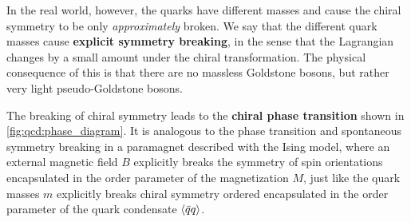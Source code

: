In the real world, however, the quarks have different masses and cause the chiral symmetry to be only \emph{approximately} broken.
We say that the different quark masses cause \textbf{explicit symmetry breaking}, in the sense that the Lagrangian changes by a small amount under the chiral transformation.
The physical consequence of this is that there are no massless Goldstone bosons, but rather very light pseudo-Goldstone bosons.

The breaking of chiral symmetry leads to the \textbf{chiral phase transition} shown in \cref{fig:qcd:phase_diagram}.
It is analogous to the phase transition and spontaneous symmetry breaking in a paramagnet described with the Ising model,
where an external magnetic field $B$ explicitly breaks the symmetry of spin orientations encapsulated in the order parameter of the magnetization $M$,
just like the quark masses $m$ explicitly breaks chiral symmetry ordered encapsulated in the order parameter of the quark condensate $\langle \bar{q} q \rangle$.

